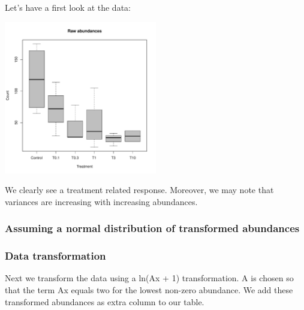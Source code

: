   
Let's have a first look at the data:
\begin{knitrout}
\color{fgcolor}\begin{kframe}
\begin{alltt}
 \hlopt{~}     \hlstd{=} \hlstd{,}
         \hlstd{=} \hlstd{,}  \hlstd{=} \hlstd{,}  \hlstd{=} \hlstd{)}
\end{alltt}
\end{kframe}

{\centering \includegraphics[width=0.5\textwidth]{appendix/usetheglm/two/count_raw_plot-1} 

}



\end{knitrout}
We clearly see a treatment related response. 
Moreover, we may note that variances are increasing with increasing abundances.



\subsubsection{Assuming a normal distribution of transformed abundances}
\subsubsection{Data transformation}
Next we transform the data using a ln(Ax + 1) transformation.
A is chosen so that the term Ax equals two for the lowest non-zero abundance.
We add these transformed abundances as extra column to our table.

